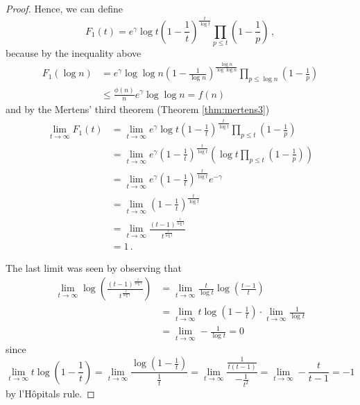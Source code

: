 \documentclass{article}
\begin{document}
\begin{theorem}
\begin{proof}
Hence, we can define
\begin{equation*}
    F_1(t)=e^\gamma \log t \left(1-\frac{1}{t}\right)^\frac{t}{\log t} \prod_{p\leq t} \left(1-\frac{1}{p}\right)\,,
\end{equation*}
because by the inequality above
\begin{align*}
    F_1(\log n) & = e^\gamma \log \log n \left(1-\frac{1}{\log n}\right)^\frac{\log n}{\log \log n} \prod_{p\leq \log n} \left(1-\frac{1}{p}\right)\\
    & \leq \frac{\phi(n)}{n} e^\gamma \log\log n = f(n)
\end{align*}
and by the Mertens' third theorem (Theorem \ref{thm:mertens3})
\begin{align*}
    \lim_{t \rightarrow \infty} F_1(t) & = \lim_{t \rightarrow \infty} e^\gamma \log t \left(1-\frac{1}{t}\right)^\frac{t}{\log t} \prod_{p\leq t} \left(1-\frac{1}{p}\right)\\
    & = \lim_{t \rightarrow \infty} e^\gamma \left( 1-\frac{1}{t}\right)^\frac{t}{\log t} \left(\log t \prod_{p\leq t} \left(1-\frac{1}{p}\right) \right)\\
    & = \lim_{t \rightarrow \infty} e^\gamma \left( 1-\frac{1}{t}\right)^\frac{t}{\log t} e^{-\gamma}\\
    & = \lim_{t \rightarrow \infty} \left( 1-\frac{1}{t}\right)^\frac{t}{\log t}\\
    & = \lim_{t \rightarrow \infty} \frac{(t-1)^\frac{t}{\log t}}{t^\frac{t}{\log t}}\\
    & = 1\,.
\end{align*}

The last limit was seen by observing that
\begin{align*}
    \lim_{t\rightarrow\infty} \log \left(\frac{(t-1)^\frac{t}{\log t}}{t^\frac{t}{\log t}}\right) & = \lim_{t\rightarrow\infty} \frac{t}{\log t} \log\left(\frac{t-1}{t}\right)\\
    & = \lim_{t\rightarrow\infty} t \log \left(1-\frac{1}{t}\right) \cdot \lim_{t\rightarrow\infty} \frac{1}{\log t}\\
    & = \lim_{t\rightarrow\infty} -\frac{1}{\log t} = 0\,
\end{align*}
since
\begin{equation*}
    \lim_{t\rightarrow\infty} t \log \left(1-\frac{1}{t}\right) = \lim_{t\rightarrow\infty} \frac{\log \left(1-\frac{1}{t}\right)}{\frac{1}{t}} = \lim_{t\rightarrow\infty} \frac{\frac{1}{t(t-1)}}{-\frac{1}{t^2}} = \lim_{t\rightarrow\infty} -\frac{t}{t-1} = -1
\end{equation*}
by l'H\^{o}pitals rule. 


\end{proof}
\end{theorem}
\end{document}
